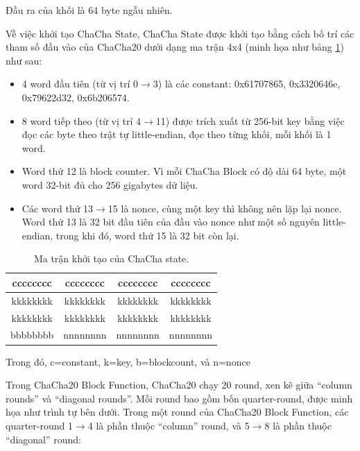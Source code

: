 Đầu ra của khối là 64 byte ngẫu nhiên.

Về việc khởi tạo ChaCha State, ChaCha State được khởi tạo bằng cách bố trí các tham số đầu vào của ChaCha20 dưới dạng ma trận 4x4 (minh họa như bảng \ref{tab:Init-CC20-State}) như sau:

\begin{itemize}
    \item 4 word đầu tiên (từ vị trí 0$\rightarrow$3) là các constant: 0x61707865, 0x3320646e, 0x79622d32, 0x6b206574.
    \item 8 word tiếp theo (từ vị trí 4$\rightarrow$11) được trích xuất từ 256-bit key bằng việc đọc các byte theo trật tự little-endian, đọc theo từng khối, mỗi khối là 1 word.
    \item Word thứ 12 là block counter. Vì mỗi ChaCha Block có độ dài 64 byte, một word 32-bit đủ cho 256 gigabytes dữ liệu. %
    \item Các word thứ 13$\rightarrow$15 là nonce, cùng một key thì không nên lặp lại nonce. Word thứ 13 là 32 bit đầu tiên của đầu vào nonce như một số nguyên little-endian, trong khi đó, word thứ 15 là 32 bit còn lại.
\end{itemize}

\begin{table}[ht]
\caption{Ma trận khởi tạo của ChaCha state.}

\label{tab:Init-CC20-State}%
\begin{center}
\begin{tabular}{|c|c|c|c|}
\hline
cccccccc & cccccccc & cccccccc & cccccccc \\ \hline
kkkkkkkk & kkkkkkkk & kkkkkkkk & kkkkkkkk \\ \hline
kkkkkkkk & kkkkkkkk & kkkkkkkk & kkkkkkkk \\ \hline
bbbbbbbb & nnnnnnnn & nnnnnnnn & nnnnnnnn \\ \hline
\end{tabular}
\end{center}
\end{table}

Trong đó, c=constant, k=key, b=blockcount, và n=nonce

Trong ChaCha20 Block Function, ChaCha20 chạy 20 round, xen kẽ giữa ``column rounds'' và ``diagonal rounds''. Mỗi round bao gồm bốn quarter-round, được minh họa như trình tự bên dưới. Trong một round của ChaCha20 Block Function, các quarter-round 1$\rightarrow$4 là phần thuộc ``column'' round, và 5$\rightarrow$8 là phần thuộc ``diagonal'' round:

